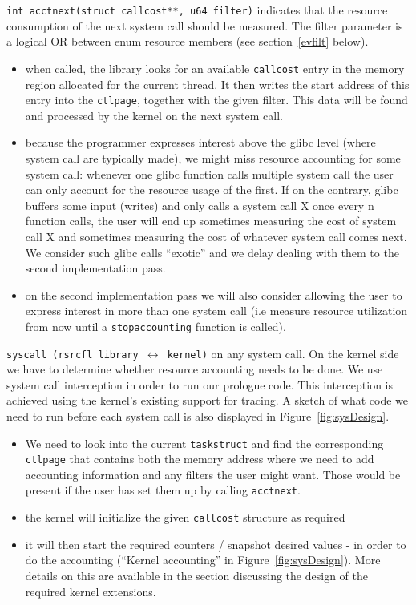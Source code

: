 \documentclass[12pt]{article}
\def\_{\textunderscore\-}
\begin{document}
{\color{blue}\texttt{int acct\_next(struct call\_cost**, u64 filter)}} indicates that the resource consumption of the next system call should be measured. The filter parameter is a logical \textsc{OR} between enum resource members (see section~\ref{evfilt} below).
\begin{itemize}
\item when called, the library looks for an available \texttt{call\_cost} entry in the memory region allocated for the current thread. It then writes the start address of this entry into the \texttt{ctl\_page}, together with the given filter. This data will be found and processed by the kernel on the next system call. 
\item because the programmer expresses interest above the glibc level (where system call are typically made), we might miss resource accounting for some system call: whenever one glibc function calls multiple system call the user can only account for the resource usage of the first. If on the contrary, glibc buffers some input (writes) and only calls a system call X once every n function calls, the user will end up sometimes measuring the cost of system call X and sometimes measuring the cost of whatever system call comes next. We consider such glibc calls “exotic” and we delay dealing with them to the second implementation pass.
\item on the second implementation pass we will also consider allowing the user to express interest in more than one system call (i.e measure resource utilization from now until a \texttt{stop\_accounting} function is called). 
\end{itemize}

{\color{red}\texttt{syscall (rsrcfl library $\longleftrightarrow$ kernel)}} on any system call. On the kernel side we have to determine whether resource accounting needs to be done. We use system call interception in order to run our prologue code. This interception is achieved using the kernel's existing support for tracing. A sketch of what code we need to run before each system call is also displayed in Figure~\ref{fig:sysDesign}.
\begin{itemize}
\item We need to look into the current \texttt{task\_struct} and find the corresponding \texttt{ctl\_page} that contains both the memory address where we need to add accounting information and any filters the user might want. Those would be present if the user has set them up by calling \texttt{acct\_next}.
\item the kernel will initialize the given \texttt{call\_cost} structure as required
\item it will then start the required counters / snapshot desired values - in order to do the accounting (``Kernel accounting'' in Figure~\ref{fig:sysDesign}). More details on this are available in the section discussing the design of the required kernel extensions.
\end{itemize}
\end{document}

